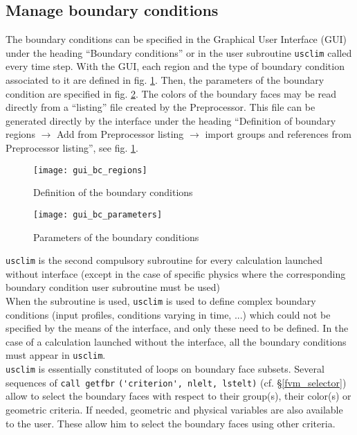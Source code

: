 {{{\subsection{Manage boundary conditions}
The boundary conditions can be specified in the Graphical User Interface (GUI) under the heading ``Boundary conditions'' or in the user subroutine \texttt{usclim} called every time step. With the GUI, each region and the type of boundary condition associated to it are defined in fig. \ref{fig:19_GUI}. Then, the parameters of the boundary condition are specified in fig. \ref{fig:20_GUI}. The colors of the boundary faces may be read directly from a ``listing'' file created by the Preprocessor. This file can be generated directly by the interface under the heading ``Definition of boundary regions $\rightarrow$ Add from Preprocessor listing $\rightarrow$ import groups and references from Preprocessor listing'', see fig. \ref{fig:19_GUI}.
%
\begin{figure}[!ht]
\begin{center}
\texttt{[image: gui\_bc\_regions]}
\caption{Definition of the boundary conditions}
\label{fig:19_GUI}
\end{center}
\end{figure}
%
\begin{figure}[!ht]
\begin{center}
\texttt{[image: gui\_bc\_parameters]}
\caption{Parameters of the boundary conditions}
\label{fig:20_GUI}
\end{center}
\end{figure}

\texttt{usclim} is the second compulsory subroutine for every calculation launched
without interface (except in the case of specific physics where the
corresponding boundary condition user subroutine must be used)  \\
When the subroutine is used, \texttt{usclim} is used to define complex
boundary conditions (input profiles, conditions varying in time, ...)
which could not be specified by the means of the interface, and only these
need to be defined. In the case of a calculation launched without the
interface, all the boundary conditions must appear in \texttt{usclim}.\\
\texttt{usclim} is essentially constituted of loops on boundary
face subsets. Several sequences 
of \verb+call getfbr+ \verb+('criterion', nlelt, lstelt)+ (cf.
\S\ref{fvm_selector}) allow to select 
the boundary faces with respect to their group(s), their
color(s) or geometric criteria. If needed, geometric and
physical variables are also available to the user. These allow him
to select the boundary faces using other criteria.

}}}
